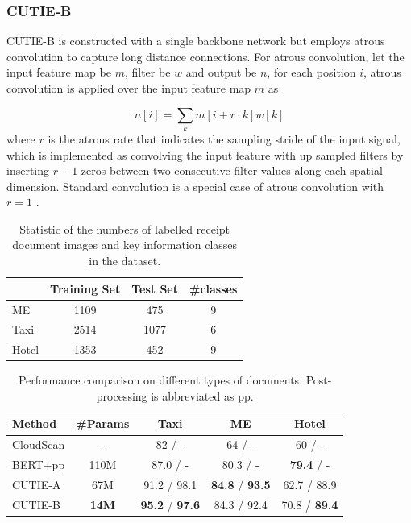 \documentclass[10pt,twocolumn,letterpaper]{article}
\begin{document}
\subsubsection{CUTIE-B}
CUTIE-B is constructed with a single backbone network but employs atrous convolution to capture long distance connections. For atrous convolution, let the input feature map be $m$, filter be $w$ and output be $n$, for each position $i$, atrous convolution is applied over the input feature map $m$ as 

\begin{equation}
n[i] = \sum_k m[i+r\cdot k]w[k]
\end{equation}
where $r$ is the atrous rate that indicates the sampling stride of the input signal, which is implemented as convolving the input feature with up sampled filters by inserting $r-1$ zeros between two consecutive filter values along each spatial dimension. Standard convolution is a special case of atrous convolution with $r=1$ \cite{deeplabv1}.

\begin{table}
	\caption{Statistic of the numbers of labelled receipt document images and key information classes in the dataset.}
\begin{center}
\begin{tabular}{l | c | c | c}
	 & Training Set & Test Set & \#classes \\
	\hline
	ME & 1109 & 475 & 9 \\
	Taxi & 2514 & 1077 & 6 \\
	Hotel & 1353 & 452 & 9 \\
\end{tabular}
\end{center}
	\label{tab:dataset}
\end{table}

\begin{table}
	\caption{Performance comparison on different types of documents. Post-processing is abbreviated as pp.}
\begin{center}
\begin{tabular}{l | c | c | c | c}
	Method & \#Params & Taxi & ME & Hotel \\
	\hline
	CloudScan\cite{cloudscan} & - & 82 / - & 64 / - & 60 / - \\
	BERT\cite{bert}+pp & 110M & 87.0 / - & 80.3 / - & \textbf{79.4} / - \\
	CUTIE-A & 67M & 91.2 / 98.1 & \textbf{84.8} / \textbf{93.5} & 62.7 / 88.9 \\
	CUTIE-B & \textbf{14M} & \textbf{95.2} / \textbf{97.6} & 84.3 / 92.4 & 70.8 / \textbf{89.4} \\
\end{tabular}
\end{center}
	\label{tab:comparison}
\end{table}
\end{document}
